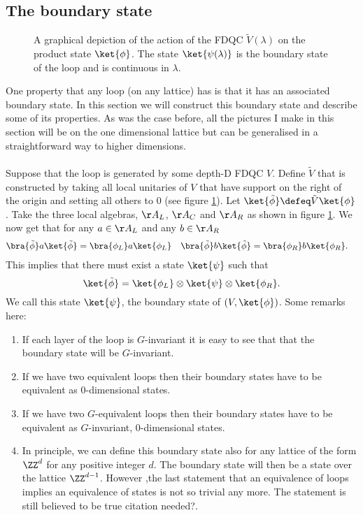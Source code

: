 \subsection{The boundary state}
\begin{figure}
	\centering
	\scalebox{0.6}{
		
	}
	\caption{A graphical depiction of the action of the FDQC $\tilde{V}(\lambda)$ on the product state $\ket{\phi}$. The state $\ket{\psi(\lambda)}$ is the boundary state of the loop and is continuous in $\lambda$.}
	\label{fig:G_InvariantContraction_WithLightcone}
\end{figure}
One property that any loop (on any lattice) has is that it has an associated boundary state. In this section we will construct this boundary state and describe some of its properties. As was the case before, all the pictures I make in this section will be on the one dimensional lattice but can be generalised in a straightforward way to higher dimensions.\\\\
Suppose that the loop is generated by some depth-D FDQC $V$. Define $\tilde{V}$ that is constructed by taking all local unitaries of $V$ that have support on the right of the origin and setting all others to $0$ (see figure \ref{fig:G_InvariantContraction_WithLightcone}). Let $\ket{\tilde{\phi}}\defeq \tilde{V}\ket{\phi}$. Take the three local algebras, $\AA_L$, $\AA_C$ and $\AA_R$ as shown in figure \ref{fig:G_InvariantContraction_WithLightcone}. We now get that for any $a\in \AA_L$ and any $b\in\AA_R$
\begin{align}
	\bra{\tilde{\phi}}a\ket{\tilde{\phi}}&=\bra{\phi_L}a\ket{\phi_L}&\bra{\tilde{\phi}}b\ket{\tilde{\phi}}&=\bra{\phi_R}b\ket{\phi_R}.
\end{align}
This implies that there must exist a state $\ket{\psi}$ such that
\begin{equation}
	\ket{\tilde{\phi}}=\ket{\phi_L}\otimes\ket{\psi}\otimes\ket{\phi_R}.
\end{equation}
We call this state $\ket{\psi}$, the boundary state of $(V,\ket{\phi})$. Some remarks here:
\begin{enumerate}
	\item If each layer of the loop is $G$-invariant it is easy to see that that the boundary state will be $G$-invariant.
	\item If we have two equivalent loops then their boundary states have to be equivalent as 0-dimensional states.
	\item If we have two $G$-equivalent loops then their boundary states have to be equivalent as $G$-invariant, 0-dimensional states.
	\item In principle, we can define this boundary state also for any lattice of the form $\ZZ^d$ for any positive integer $d$. The boundary state will then be a state over the lattice $\ZZ^{d-1}$. However ,the last statement that an equivalence of loops implies an equivalence of states is not so trivial any more. The statement is still believed to be true {\color{red}citation needed?}.
\end{enumerate}

